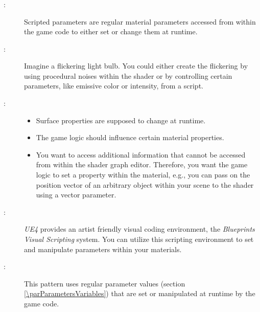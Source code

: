 \subsubsection{\parParametersScripted}\label{\parParametersScripted}

\begin{description}
	\item[\patIntent:]%
	Scripted parameters are regular material parameters accessed from within the game code to either set or change them at runtime. 
	\item[\patMotivation:]%
	Imagine a flickering light bulb. You could either create the flickering by using procedural noises within the shader or by controlling certain parameters, like emissive color or intensity, from a script. 	
	\item[\patApplicability:]\hfill
	\begin{itemize}\mynobreakpar
		\item Surface properties are supposed to change at runtime.
		\item The game logic should influence certain material properties. 
		\item You want to access additional information that cannot be accessed from within the shader graph editor. Therefore, you want the game logic to set a property within the material, e.g., you can pass on the position vector of an arbitrary object within your scene to the shader using a vector parameter.
	\end{itemize}
	\item[\patImplementation:]%
	\emph{UE4} provides an artist friendly visual coding environment, the \emph{Blueprints Visual Scripting} system. You can utilize this scripting environment to set and manipulate parameters within your materials. 
	\item[\patRelations:]%
	This pattern uses regular parameter values \emph{\parParametersVariables} (section \ref{\parParametersVariables}) that are set or manipulated at runtime by the game code. 
\end{description}


